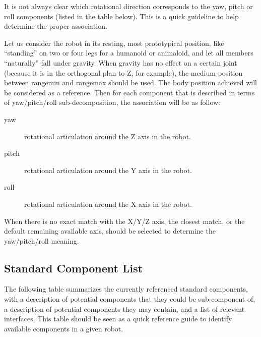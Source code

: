 It is not always clear which rotational direction corresponds to the
yaw, pitch or roll components (listed in the table below). This is a
quick guideline to help determine the proper association.

Let us consider the robot in its resting, most prototypical position,
like ``standing'' on two or four legs for a humanoid or animaloid, and
let all members ``naturally'' fall under gravity. When gravity has no
effect on a certain joint (because it is in the orthogonal plan to Z,
for example), the medium position between rangemin and rangemax should
be used. The body position achieved will be considered as a reference.
Then for each component that is described in terms of yaw/pitch/roll
sub-decomposition, the association will be as follow:

\begin{description}
\item[yaw] rotational articulation around the Z axis in the robot.
\item[pitch] rotational articulation around the Y axis in the robot.
\item[roll] rotational articulation around the X axis in the robot.
\end{description}

When there is no exact match with the X/Y/Z axis, the closest match, or
the default remaining available axis, should be selected to determine
the yaw/pitch/roll meaning.

\subsection{Standard Component List}
\label{sec:naming:components}

The following table summarizes the currently referenced standard
components, with a description of potential components that they could
be sub-component of, a description of potential components they may
contain, and a list of relevant interfaces. This table should be seen as a
quick reference guide to identify available components in a given
robot.

\newcommand{\component}[5]
{
  \lstindex{#1} &
  #5 &
  \code{#2} &
  \code{#3} &
  \code{#4}\\
  \hline
}

